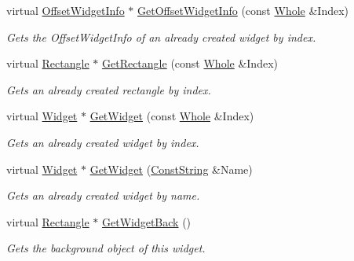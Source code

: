 \begin{DoxyCompactItemize}
virtual \hyperlink{structMezzanine_1_1UI_1_1ResizingInfo}{OffsetWidgetInfo} $\ast$ \hyperlink{classMezzanine_1_1UI_1_1RenderableContainerWidget_aa06bf93fc0969e52b00d6b37d1ebd94f}{GetOffsetWidgetInfo} (const \hyperlink{namespaceMezzanine_adcbb6ce6d1eb4379d109e51171e2e493}{Whole} \&Index)
\begin{DoxyCompactList}\small\item\em Gets the OffsetWidgetInfo of an already created widget by index. \item\end{DoxyCompactList}\item 
virtual \hyperlink{classMezzanine_1_1UI_1_1Rectangle}{Rectangle} $\ast$ \hyperlink{classMezzanine_1_1UI_1_1RenderableContainerWidget_a1334e1240c24338f64733200b17ec1b9}{GetRectangle} (const \hyperlink{namespaceMezzanine_adcbb6ce6d1eb4379d109e51171e2e493}{Whole} \&Index)
\begin{DoxyCompactList}\small\item\em Gets an already created rectangle by index. \item\end{DoxyCompactList}\item 
virtual \hyperlink{classMezzanine_1_1UI_1_1Widget}{Widget} $\ast$ \hyperlink{classMezzanine_1_1UI_1_1RenderableContainerWidget_a78b0efca881531555270c395736440dd}{GetWidget} (const \hyperlink{namespaceMezzanine_adcbb6ce6d1eb4379d109e51171e2e493}{Whole} \&Index)
\begin{DoxyCompactList}\small\item\em Gets an already created widget by index. \item\end{DoxyCompactList}\item 
virtual \hyperlink{classMezzanine_1_1UI_1_1Widget}{Widget} $\ast$ \hyperlink{classMezzanine_1_1UI_1_1RenderableContainerWidget_a571b5ca8add99b46681e28c7f0dff94f}{GetWidget} (\hyperlink{namespaceMezzanine_a63cd699ac54b73953f35ec9cfc05e506}{ConstString} \&Name)
\begin{DoxyCompactList}\small\item\em Gets an already created widget by name. \item\end{DoxyCompactList}\item 
virtual \hyperlink{classMezzanine_1_1UI_1_1Rectangle}{Rectangle} $\ast$ \hyperlink{classMezzanine_1_1UI_1_1RenderableContainerWidget_a2460c47cb84718ba7f23399ebc31a536}{GetWidgetBack} ()
\begin{DoxyCompactList}\small\item\em Gets the background object of this widget. \item\end{DoxyCompactList}\item 

\end{DoxyCompactItemize}
